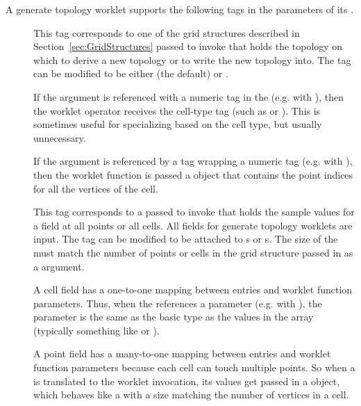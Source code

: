 A generate topology worklet supports the following tags in the parameters
of its \controlsignature.
\begin{description}
\item[] This tag corresponds to one of the grid structures
  described in Section~\ref{sec:GridStructures} passed to invoke that holds
  the topology on which to derive a new topology or to write the new
  topology into. The  tag can be modified to be either
   (the default) or .

  If the  argument is referenced with a numeric tag in the
  \executionsignature (e.g. with ), then the worklet operator
  receives the cell-type tag (such as  or
  ). This is sometimes useful for specializing   based
  on the cell type, but usually unnecessary.

  If the  argument is referenced by a 
  tag wrapping a numeric tag (e.g. with ), then
  the worklet function is passed a  object that
  contains the point indices for all the vertices of the cell.
\item[] This tag corresponds to a 
  passed to invoke that holds the sample values for a field at all points
  or all cells. All fields for generate topology worklets are input. The
   tag can be modified to be attached to s or
  s. The size of the  must match the
  number of points or cells in the grid structure passed in as a
   argument.

  A cell field has a one-to-one mapping between 
  entries and worklet function parameters. Thus, when the
  \executionsignature references a \controlsignature {}
  parameter (e.g. with ), the parameter is the same as the
  basic type as the values in the array (typically something like
   or ).

  A point field has a many-to-one mapping between 
  entries and worklet function parameters because each cell can touch
  multiple points. So when a  is translated to the
  worklet invocation, its values get passed in a 
  object, which behaves like a  with a size matching the number
  of vertices in a cell.
\end{description}

